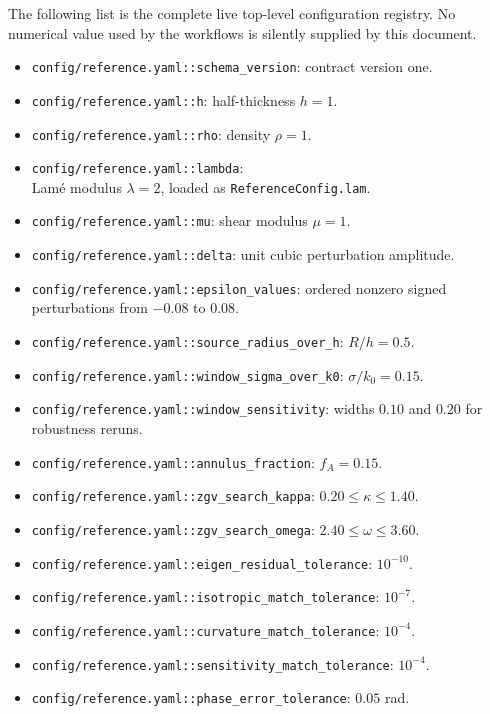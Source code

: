 The following list is the complete live top-level configuration registry.
No numerical value used by the workflows is silently supplied by this
document.

{\small
\begin{itemize}
\item \texttt{config/reference.yaml::schema\_version}: contract version one.
\item \texttt{config/reference.yaml::h}: half-thickness \(h=1\).
\item \texttt{config/reference.yaml::rho}: density \(\rho=1\).
\item \texttt{config/reference.yaml::lambda}:\\
Lam\'e modulus \(\lambda=2\), loaded as \texttt{ReferenceConfig.lam}.
\item \texttt{config/reference.yaml::mu}: shear modulus \(\mu=1\).
\item \texttt{config/reference.yaml::delta}: unit cubic perturbation amplitude.
\item \texttt{config/reference.yaml::epsilon\_values}: ordered nonzero signed
perturbations from \(-0.08\) to \(0.08\).
\item \texttt{config/reference.yaml::source\_radius\_over\_h}: \(R/h=0.5\).
\item \texttt{config/reference.yaml::window\_sigma\_over\_k0}:
\(\sigma/k_0=0.15\).
\item \texttt{config/reference.yaml::window\_sensitivity}: widths \(0.10\)
and \(0.20\) for robustness reruns.
\item \texttt{config/reference.yaml::annulus\_fraction}: \(f_A=0.15\).
\item \texttt{config/reference.yaml::zgv\_search\_kappa}:
\(0.20\leq\kappa\leq1.40\).
\item \texttt{config/reference.yaml::zgv\_search\_omega}:
\(2.40\leq\omega\leq3.60\).
\item \texttt{config/reference.yaml::eigen\_residual\_tolerance}: \(10^{-10}\).
\item \texttt{config/reference.yaml::isotropic\_match\_tolerance}: \(10^{-7}\).
\item \texttt{config/reference.yaml::curvature\_match\_tolerance}: \(10^{-4}\).
\item \texttt{config/reference.yaml::sensitivity\_match\_tolerance}: \(10^{-4}\).
\item \texttt{config/reference.yaml::phase\_error\_tolerance}: \(0.05\) rad.
\end{itemize}
}

